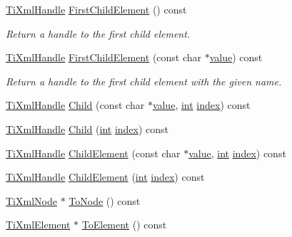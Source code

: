 \begin{DoxyCompactItemize}
\hyperlink{class_ti_xml_handle}{Ti\-Xml\-Handle} \hyperlink{class_ti_xml_handle_a24d1112e995e937e4dddb202d4113d4a}{First\-Child\-Element} () const 
\begin{DoxyCompactList}\small\item\em Return a handle to the first child element. \end{DoxyCompactList}\item 
\hyperlink{class_ti_xml_handle}{Ti\-Xml\-Handle} \hyperlink{class_ti_xml_handle_af0aea751320f5e430fac6f8fff3b8dd4}{First\-Child\-Element} (const char $\ast$\hyperlink{fmod__dsp_8h_a6a4f8a1a444e9080b297963b3db29fe0}{value}) const 
\begin{DoxyCompactList}\small\item\em Return a handle to the first child element with the given name. \end{DoxyCompactList}\item 
\hyperlink{class_ti_xml_handle}{Ti\-Xml\-Handle} \hyperlink{class_ti_xml_handle_a072492b4be1acdb0db2d03cd8f71ccc4}{Child} (const char $\ast$\hyperlink{fmod__dsp_8h_a6a4f8a1a444e9080b297963b3db29fe0}{value}, \hyperlink{wglew_8h_a500a82aecba06f4550f6849b8099ca21}{int} \hyperlink{fmod__codec_8h_a57f14e05b1900f16a2da82ade47d0c6d}{index}) const 
\item 
\hyperlink{class_ti_xml_handle}{Ti\-Xml\-Handle} \hyperlink{class_ti_xml_handle_af9cf6a7d08a5da94a8924425ad0cd5ac}{Child} (\hyperlink{wglew_8h_a500a82aecba06f4550f6849b8099ca21}{int} \hyperlink{fmod__codec_8h_a57f14e05b1900f16a2da82ade47d0c6d}{index}) const 
\item 
\hyperlink{class_ti_xml_handle}{Ti\-Xml\-Handle} \hyperlink{class_ti_xml_handle_a979a3f850984a176ee884e394c7eed2d}{Child\-Element} (const char $\ast$\hyperlink{fmod__dsp_8h_a6a4f8a1a444e9080b297963b3db29fe0}{value}, \hyperlink{wglew_8h_a500a82aecba06f4550f6849b8099ca21}{int} \hyperlink{fmod__codec_8h_a57f14e05b1900f16a2da82ade47d0c6d}{index}) const 
\item 
\hyperlink{class_ti_xml_handle}{Ti\-Xml\-Handle} \hyperlink{class_ti_xml_handle_a8786475b9d1f1518492e3a46704c7ef0}{Child\-Element} (\hyperlink{wglew_8h_a500a82aecba06f4550f6849b8099ca21}{int} \hyperlink{fmod__codec_8h_a57f14e05b1900f16a2da82ade47d0c6d}{index}) const 
\item 
\hyperlink{class_ti_xml_node}{Ti\-Xml\-Node} $\ast$ \hyperlink{class_ti_xml_handle_af678e5088e83be67baf76f699756f2c3}{To\-Node} () const 
\item 
\hyperlink{class_ti_xml_element}{Ti\-Xml\-Element} $\ast$ \hyperlink{class_ti_xml_handle_abc6e7ed383a5fe1e52b0c0004b457b9e}{To\-Element} () const 

\end{DoxyCompactItemize}
